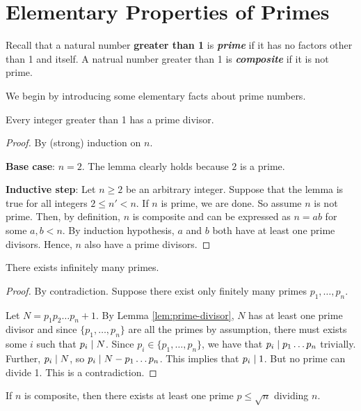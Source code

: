 \section{Elementary Properties of Primes}

Recall that a natural number \textbf{greater than 1} is \textit{\textbf{prime}} if it has no factors other than 1 and itself. A natrual number greater than 1 is \textit{\textbf{composite}} if it is not prime.

We begin by introducing some elementary facts about prime numbers.

\begin{lemma} \label{lem:prime-divisor}
    Every integer greater than 1 has a prime divisor.
\end{lemma}

\begin{proof}
    By (strong) induction on $n$.

    \textbf{Base case}: $n = 2$. The lemma clearly holds because $2$ is a prime.

    \textbf{Inductive step}: Let $n \geq 2$ be an arbitrary integer. Suppose that the lemma is true for all integers $2 \leq n' < n$. If $n$ is prime, we are done. So assume $n$ is not prime. Then, by definition, $n$ is composite and can be expressed as $n = ab$ for some $a,b < n$. By induction hypothesis, $a$ and $b$ both have at least one prime divisors. Hence, $n$ also have a prime divisors.
\end{proof}

\begin{theorem}
   There exists infinitely many primes. 
\end{theorem}

\begin{proof}
    By contradiction. Suppose there exist only finitely many primes $p_1,\ldots,p_n$.

    Let $N = p_1p_2\ldots p_n + 1$. By Lemma \ref{lem:prime-divisor}, $N$ has at least one prime divisor and since $\{p_1,\ldots,p_n\}$ are all the primes by assumption, there must exists some $i$ such that $p_i \mathrel{\mid} N$. Since $p_i \in \{p_1,\ldots,p_n\}$, we have that $p_i \mathrel{\mid} p_1\ldots p_n$ trivially. Further, $p_i \mathrel{\mid} N$, so $p_i \mathrel{\mid} N - p_1\ldots p_n$. This implies that $p_i \mathrel{\mid} 1$. But no prime can divide 1. This is a contradiction.
\end{proof}

\begin{proposition}
    If $n$ is composite, then there exists at least one prime $p \leq \sqrt{n}$ dividing $n$.
\end{proposition}

